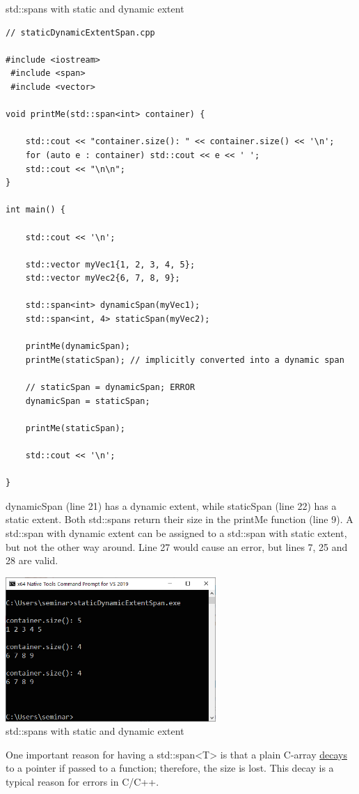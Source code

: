\noindent
std::spans with static and dynamic extent
\begin{lstlisting}[style=styleCXX]
// staticDynamicExtentSpan.cpp

#include <iostream>
 #include <span>
 #include <vector>

void printMe(std::span<int> container) {
	
	std::cout << "container.size(): " << container.size() << '\n';
	for (auto e : container) std::cout << e << ' ';
	std::cout << "\n\n";
}

int main() {

	std::cout << '\n';
	
	std::vector myVec1{1, 2, 3, 4, 5};
	std::vector myVec2{6, 7, 8, 9};
	
	std::span<int> dynamicSpan(myVec1);
	std::span<int, 4> staticSpan(myVec2);
	
	printMe(dynamicSpan);
	printMe(staticSpan); // implicitly converted into a dynamic span
	
	// staticSpan = dynamicSpan; ERROR
	dynamicSpan = staticSpan;
	
	printMe(staticSpan);
	
	std::cout << '\n';

}
\end{lstlisting}

dynamicSpan (line 21) has a dynamic extent, while staticSpan (line 22) has a static extent. Both std::spans return their size in the printMe function (line 9). A std::span with dynamic extent can be assigned to a std::span with static extent, but not the other way around. Line 27 would cause an error, but lines 7, 25 and 28 are valid.

\begin{center}
\includegraphics[width=0.6\textwidth]{content/3/chapter5/images/4.png}\\
std::spans with static and dynamic extent
\end{center}

One important reason for having a std::span<T> is that a plain C-array \href{https://en.cppreference.com/w/cpp/types/decay}{decays} to a pointer if passed to a function; therefore, the size is lost. This decay is a typical reason for errors in C/C++.

